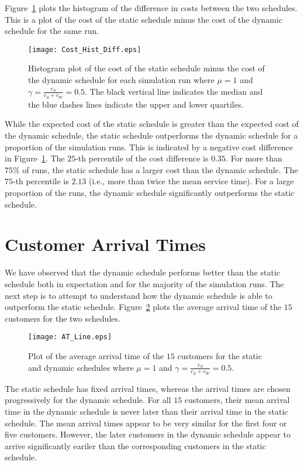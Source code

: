 Figure~\ref{fig:Diff_Cost} plots the histogram of the difference in costs between the two schedules. This is a plot of the cost of the static schedule minus the cost of the dynamic schedule for the same run.
\begin{figure}[htb]
	\centering
	\texttt{[image: Cost\_Hist\_Diff.eps]}
	\caption{Histogram plot of the cost of the static schedule minus the cost of the dynamic schedule for each simulation run where $\mu = 1$ and $\gamma = \frac{c_{S}}{c_{S} + c_{W}} = 0.5$. The black vertical line indicates the median and the blue dashes lines indicate the upper and lower quartiles.}
	\label{fig:Diff_Cost}
\end{figure}

While the expected cost of the static schedule is greater than the expected cost of the dynamic schedule, the static schedule outperforms the dynamic schedule for a proportion of the simulation runs. This is indicated by a negative cost difference in Figure~\ref{fig:Diff_Cost}. The $25$-th percentile of the cost difference is $0.35$. For more than $75 \%$ of runs, the static schedule has a larger cost than the dynamic schedule. The $75$-th percentile is $2.13$ (i.e., more than twice the mean service time). For a large proportion of the runs, the dynamic schedule significantly outperforms the static schedule.

\section{Customer Arrival Times}
We have observed that the dynamic schedule performs better than the static schedule both in expectation and for the majority of the simulation runs. The next step is to attempt to understand how the dynamic schedule is able to outperform the static schedule. Figure~\ref{fig:Avg_Arrival} plots the average arrival time of the $15$ customers for the two schedules.
\begin{figure}[htb]
	\centering
	\texttt{[image: AT\_Line.eps]}
	\caption{Plot of the average arrival time of the $15$ customers for the static and dynamic schedules where $\mu = 1$ and $\gamma = \frac{c_{S}}{c_{S} + c_{W}} = 0.5$.}
	\label{fig:Avg_Arrival}
\end{figure}

The static schedule has fixed arrival times, whereas the arrival times are chosen progressively for the dynamic schedule. For all $15$ customers, their mean arrival time in the dynamic schedule is never later than their arrival time in the static schedule. The mean arrival times appear to be very similar for the first four or five customers. However, the later customers in the dynamic schedule appear to arrive significantly eariler than the corresponding customers in the static schedule.

